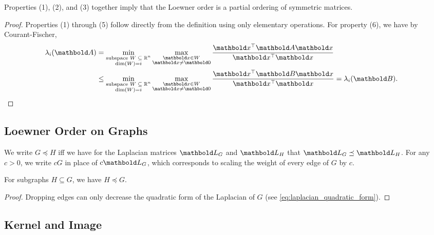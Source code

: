\begin{rmk}
Properties (1), (2), and (3) together imply that the Loewner order is a partial ordering of symmetric matrices.
\end{rmk}
\begin{proof} Properties (1) through (5) follow directly from the definition using only elementary operations. For property (6), we have by Courant-Fischer, \begin{align*}
    \lambda_i(\mA) &= \min_{\substack{\text{subspace $\sW \subseteq \R^n$} \\ \dim(\sW) = i}} \max_{\substack{\vx \in \sW \\ \vx \neq \vZero}} \frac{\trans{\vx}\mA\vx}{\trans{\vx}\vx} \\
    &\leq \min_{\substack{\text{subspace $\sW \subseteq \R^n$} \\ \dim(\sW) = i}} \max_{\substack{\vx \in \sW \\ \vx \neq \vZero}} \frac{\trans{\vx}\mB\vx}{\trans{\vx}\vx} = \lambda_i(\mB). &\qedhere
\end{align*}
\end{proof}

\subsection{Loewner Order on Graphs}

\begin{defn} We write $G \preceq H$ iff we have for the Laplacian matrices $\mL_G$ and $\mL_H$ that $\mL_G \preceq \mL_H$. For any $c > 0$, we write $c G$ in place of $c \mL_G$, which corresponds to scaling the weight of every edge of $G$ by $c$.
\end{defn}
\begin{lem} For subgraphs $H \subseteq G$, we have $H \preceq G$.
\end{lem}
\begin{proof} Dropping edges can only decrease the quadratic form of the Laplacian of $G$ (see \cref{eq:laplacian_quadratic_form}).
\end{proof}

\subsection{Kernel and Image}


